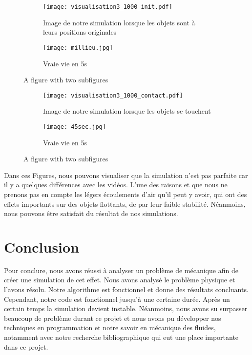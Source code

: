     \begin{figure}
        \centering
        \begin{subfigure}{.5\textwidth}
            \centering
            \texttt{[image: visualisation3\_1000\_init.pdf]}
            \caption{Image de notre simulation lorsque les objets sont à leurs positions originales}
        \end{subfigure}%
        \begin{subfigure}{.5\textwidth}
            \centering
            \texttt{[image: millieu.jpg]}
            \caption{Vraie vie en 5s}
        \end{subfigure}
        \caption{A figure with two subfigures}
    \end{figure}

    \begin{figure}
        \centering
        \begin{subfigure}{.5\textwidth}
            \centering
            \texttt{[image: visualisation3\_1000\_contact.pdf]}
            \caption{Image de notre simulation lorsque les objets se touchent}
        \end{subfigure}%
        \begin{subfigure}{.5\textwidth}
            \centering
            \texttt{[image: 45sec.jpg]}
            \caption{Vraie vie en 5s}
        \end{subfigure}
        \caption{A figure with two subfigures}
    \end{figure}
    
    Dans ces Figures, nous pouvons visualiser que la simulation n'est pas parfaite car il y a quelques différences avec les vidéos. L'une des raisons et que nous ne prenons pas en compte les légers écoulements d'air qu'il peut y avoir, qui ont des effets importants sur des objets flottants, de par leur faible stabilité. Néanmoins, nous pouvons être satisfait du résultat de nos simulations.
    
\twocolumn
\section*{Conclusion}
    Pour conclure, nous avons réussi à analyser un problème de mécanique afin de créer une simulation de cet effet. Nous avons analysé le problème physique et l'avons résolu. Notre algorithme est fonctionnel et donne des résultats concluants. Cependant, notre code est fonctionnel jusqu'à une certaine durée. Après un certain temps la simulation devient instable. Néanmoins, nous avons su surpasser beaucoup de problème durant ce projet et nous avons pu développer nos techniques en programmation et notre savoir en mécanique des fluides, notamment avec notre recherche bibliographique qui eut une place importante dans ce projet. 
